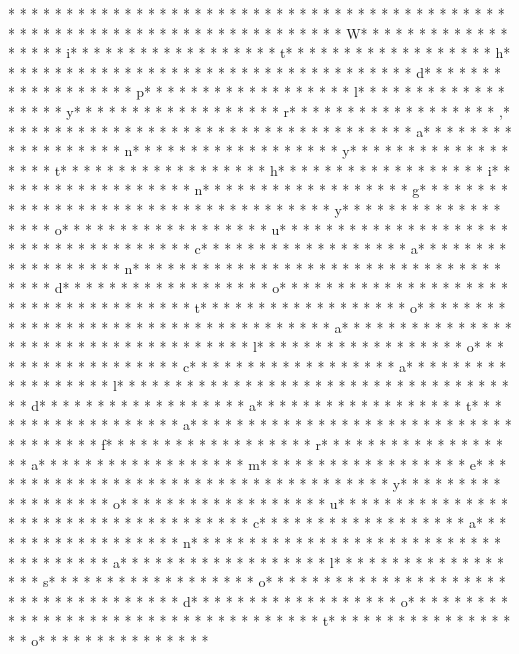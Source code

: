 * * *  * * *  * * *  *  * * *  *  * * *  * 	* * *  * * *  * * *  *  * * *  *  * * *  * 	* * *  * * *  * * *  *  * * *  *  * * *  * 	* * *  * * *  * * *  *  * * *  *  * * *  * W* * *  * * *  * * *  *  * * *  *  * * *  * i* * *  * * *  * * *  *  * * *  *  * * *  * t* * *  * * *  * * *  *  * * *  *  * * *  * h* * *  * * *  * * *  *  * * *  *  * * *  *  * * *  * * *  * * *  *  * * *  *  * * *  * d* * *  * * *  * * *  *  * * *  *  * * *  * p* * *  * * *  * * *  *  * * *  *  * * *  * l* * *  * * *  * * *  *  * * *  *  * * *  * y* * *  * * *  * * *  *  * * *  *  * * *  * r* * *  * * *  * * *  *  * * *  *  * * *  * ,* * *  * * *  * * *  *  * * *  *  * * *  *  * * *  * * *  * * *  *  * * *  *  * * *  * a* * *  * * *  * * *  *  * * *  *  * * *  * n* * *  * * *  * * *  *  * * *  *  * * *  * y* * *  * * *  * * *  *  * * *  *  * * *  * t* * *  * * *  * * *  *  * * *  *  * * *  * h* * *  * * *  * * *  *  * * *  *  * * *  * i* * *  * * *  * * *  *  * * *  *  * * *  * n* * *  * * *  * * *  *  * * *  *  * * *  * g* * *  * * *  * * *  *  * * *  *  * * *  *  * * *  * * *  * * *  *  * * *  *  * * *  * y* * *  * * *  * * *  *  * * *  *  * * *  * o* * *  * * *  * * *  *  * * *  *  * * *  * u* * *  * * *  * * *  *  * * *  *  * * *  *  * * *  * * *  * * *  *  * * *  *  * * *  * c* * *  * * *  * * *  *  * * *  *  * * *  * a* * *  * * *  * * *  *  * * *  *  * * *  * n* * *  * * *  * * *  *  * * *  *  * * *  *  * * *  * * *  * * *  *  * * *  *  * * *  * d* * *  * * *  * * *  *  * * *  *  * * *  * o* * *  * * *  * * *  *  * * *  *  * * *  *  * * *  * * *  * * *  *  * * *  *  * * *  * t* * *  * * *  * * *  *  * * *  *  * * *  * o* * *  * * *  * * *  *  * * *  *  * * *  *  * * *  * * *  * * *  *  * * *  *  * * *  * a* * *  * * *  * * *  *  * * *  *  * * *  *  * * *  * * *  * * *  *  * * *  *  * * *  * l* * *  * * *  * * *  *  * * *  *  * * *  * o* * *  * * *  * * *  *  * * *  *  * * *  * c* * *  * * *  * * *  *  * * *  *  * * *  * a* * *  * * *  * * *  *  * * *  *  * * *  * l* * *  * * *  * * *  *  * * *  *  * * *  *  * * *  * * *  * * *  *  * * *  *  * * *  * d* * *  * * *  * * *  *  * * *  *  * * *  * a* * *  * * *  * * *  *  * * *  *  * * *  * t* * *  * * *  * * *  *  * * *  *  * * *  * a* * *  * * *  * * *  *  * * *  *  * * *  *  * * *  * * *  * * *  *  * * *  *  * * *  * f* * *  * * *  * * *  *  * * *  *  * * *  * r* * *  * * *  * * *  *  * * *  *  * * *  * a* * *  * * *  * * *  *  * * *  *  * * *  * m* * *  * * *  * * *  *  * * *  *  * * *  * e* * *  * * *  * * *  *  * * *  *  * * *  *  * * *  * * *  * * *  *  * * *  *  * * *  * y* * *  * * *  * * *  *  * * *  *  * * *  * o* * *  * * *  * * *  *  * * *  *  * * *  * u* * *  * * *  * * *  *  * * *  *  * * *  *  * * *  * * *  * * *  *  * * *  *  * * *  * c* * *  * * *  * * *  *  * * *  *  * * *  * a* * *  * * *  * * *  *  * * *  *  * * *  * n* * *  * * *  * * *  *  * * *  *  * * *  *  * * *  * * *  * * *  *  * * *  *  * * *  * a* * *  * * *  * * *  *  * * *  *  * * *  * l* * *  * * *  * * *  *  * * *  *  * * *  * s* * *  * * *  * * *  *  * * *  *  * * *  * o* * *  * * *  * * *  *  * * *  *  * * *  *  * * *  * * *  * * *  *  * * *  *  * * *  * d* * *  * * *  * * *  *  * * *  *  * * *  * o* * *  * * *  * * *  *  * * *  *  * * *  *  * * *  * * *  * * *  *  * * *  *  * * *  * t* * *  * * *  * * *  *  * * *  *  * * *  * o* * *  * * *  * * *  *  * * *  *  * 